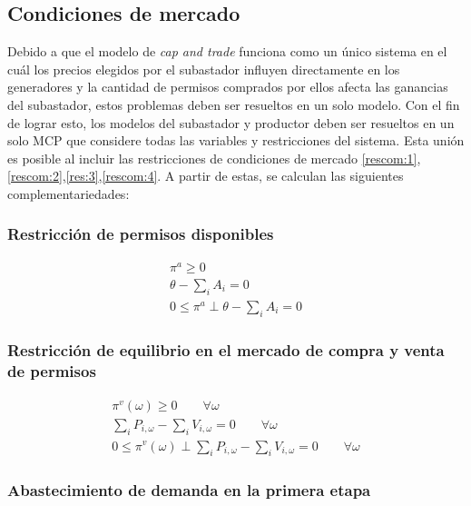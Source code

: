 \subsection{Condiciones de mercado}\label{MCPmercado}

Debido a que el modelo de \textit{cap and trade} funciona como un único sistema en el cuál los precios elegidos por el subastador influyen directamente en los generadores y la cantidad de permisos comprados por ellos afecta las ganancias del subastador, estos problemas deben ser resueltos en un solo modelo. Con el fin de lograr esto, los modelos del subastador y productor deben ser resueltos en un solo MCP que considere todas las variables y restricciones del sistema. Esta unión es posible al incluir las restricciones de condiciones de mercado \ref{rescom:1}, \ref{rescom:2},\ref{res:3},\ref{rescom:4}. A partir de estas, se calculan las siguientes complementariedades:

\subsubsection{Restricción de permisos disponibles}
\begin{footnotesize}
\begin{align}
 \pi^a \geq 0 \\
 \theta - \sum_{i}A_i = 0 \\
0 \leq \pi^a \perp \theta - \sum_{i}A_i= 0 \label{complementariedadcondicion1}
\end{align}
\end{footnotesize}


\subsubsection{Restricción de equilibrio en el mercado de compra y venta de permisos}

\begin{footnotesize}
\begin{align}
 \pi^v(\omega) \geq 0 \qquad \forall \omega\\
 \sum_{i}P_{i,\omega} - \sum_{i}V_{i,\omega} = 0 \qquad \forall \omega \\
0 \leq \pi^v(\omega) \perp \sum_{i}P_{i,\omega} - \sum_{i}V_{i,\omega} = 0 \qquad \forall \omega
\end{align}
\end{footnotesize}


\subsubsection{Abastecimiento de demanda en la primera etapa}

